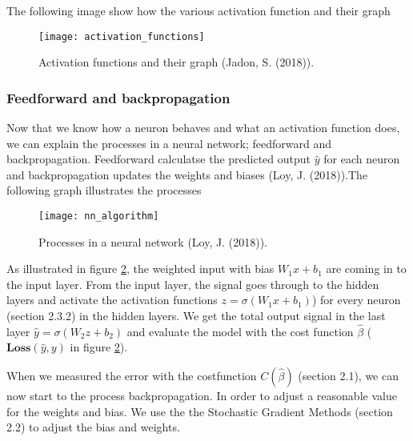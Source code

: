 \documentclass[11pt,english, A4]{article}
\begin{document}
The following image show how the various activation function and their graph
\begin{figure}[H]
  \begin{center}
  \texttt{[image: activation\_functions]}
  \caption{Activation functions and their graph (Jadon, S. (2018)).}
  \label{fig:activation_functions}
  \end{center}
\end{figure}



\subsubsection{Feedforward and backpropagation}
Now that we know how a neuron behaves and what an activation function does, we can explain the processes in a neural network; feedforward and backpropagation. Feedforward calculatse the predicted output \textbf{$\hat{y}$} for each neuron and backpropagation updates the weights and biases (Loy, J. (2018)).The following graph illustrates the processes 

\begin{figure}[H]
  \begin{center}
  \texttt{[image: nn\_algorithm]}
  \caption{Processes in a neural network (Loy, J. (2018)).}
  \label{fig:nn_algorithm}
  \end{center}
\end{figure}

As illustrated in figure \ref{fig:nn_algorithm}, the weighted input with bias $W_1x + b_1$ are coming in to the input layer. From the input layer, the signal goes through to the hidden layers and activate the activation functions $z = \sigma(W_1x+b_1)$) for every neuron (section 2.3.2) in the hidden layers. We get the total output signal in the last layer $\hat{y} = \sigma(W_{2}z+ b_2)$ and evaluate the model with the cost function $\hat\beta$ ($\textbf{Loss}(\hat y, y)$ in figure \ref{fig:nn_algorithm}). 

When we measured the error with the costfunction $C(\hat\beta)$ (section 2.1), we can now start to the process backpropagation. In order to adjust a reasonable value for the weights and bias. We use the the Stochastic Gradient Methods (section 2.2) to adjust the bias and weights.
 


\end{document}
